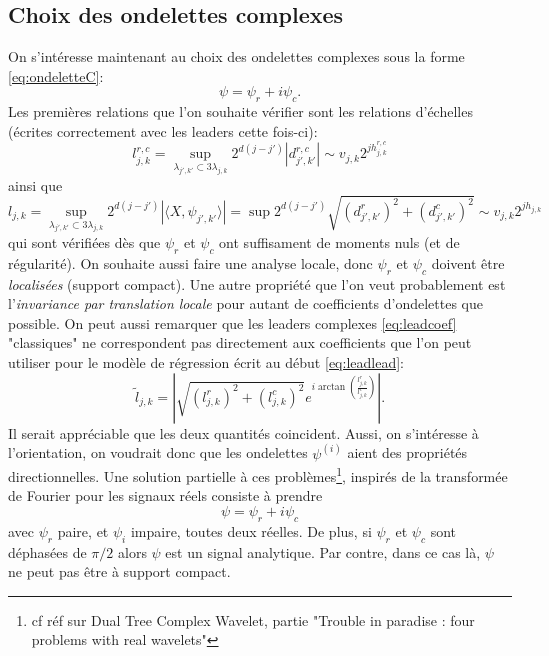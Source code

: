 \documentclass[11pt]{article} %
\begin{document}
\subsection{Choix des ondelettes complexes}
	On s'intéresse maintenant au choix des ondelettes complexes sous la forme \ref{eq:ondeletteC}:
\begin{equation}
	\psi = \psi_r + i\psi_c.
\end{equation}
Les premières relations que l'on souhaite vérifier sont les relations d'échelles (écrites correctement avec les leaders cette fois-ci):
\begin{equation}
	l^{r,c}_{j,k} = \sup_{\lambda_{j',k'} \subset 3\lambda_{j,k}} 2^{d(j-j')}|d_{j',k'}^{r,c}| \sim v_{j,k}2^{jh_{j,k}^{r,c}}
\end{equation}
ainsi que 
\begin{equation}\label{eq:leadcoef}
	l_{j,k} = \sup_{\lambda_{j',k'}\subset 3\lambda_{j,k}} 2^{d(j-j')}|\langle X, \psi_{j',k'}\rangle| = \sup2^{d(j-j')}\sqrt{(d_{j',k'}^r)^2 + (d_{j',k'}^c)^2} \sim v_{j,k}2^{jh_{j,k}}
\end{equation}
qui sont vérifiées dès que $\psi_r$ et $\psi_c$ ont suffisament de moments nuls (et de régularité). 
\newline
On souhaite aussi faire une analyse locale, donc $\psi_r$ et $\psi_c$ doivent être \emph{localisées} (support compact).
\newline
Une autre propriété que l'on veut probablement est l'\emph{invariance par translation locale} pour autant de coefficients d'ondelettes que possible.
\newline
On peut aussi remarquer que les leaders complexes \ref{eq:leadcoef} "classiques" ne correspondent pas directement aux coefficients que l'on peut utiliser pour le modèle de régression écrit au début \ref{eq:leadlead}:
\begin{equation}
	\tilde l_{j,k} =|\sqrt{(l_{j,k}^r)^2 + (l_{j,k}^c)^2}e^{i\arctan\left(\frac{l_{j,k}^r}{l_{j,k}^c}\right)}|.
\end{equation}
Il serait appréciable que les deux quantités coincident.
\newline
Aussi, on s'intéresse à l'orientation, on voudrait donc que les ondelettes $\psi^{(i)}$ aient des propriétés directionnelles.
\newline
Une solution partielle à ces problèmes\footnote{cf réf sur Dual Tree Complex Wavelet, partie "Trouble in paradise : four problems with real wavelets"}, inspirés de la transformée de Fourier pour les signaux réels consiste à prendre 
\begin{equation}
	\psi = \psi_r + i\psi_c
\end{equation}
avec $\psi_r$ paire, et $\psi_i$ impaire, toutes deux réelles. De plus, si $\psi_r$ et $\psi_c$ sont déphasées de $\pi/2$ alors $\psi$ est un signal analytique. Par contre, dans ce cas là, $\psi$ ne peut pas être à support compact.
\end{document}
